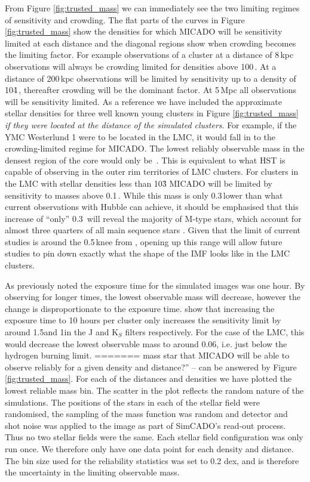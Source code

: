 From Figure \ref{fig:trusted_mass} we can immediately see the two limiting
regimes of sensitivity and crowding. The flat parts of the curves in Figure
\ref{fig:trusted_mass} show the densities for which MICADO will be
sensitivity  limited at each distance and the diagonal regions show when
crowding becomes the limiting factor. For example observations of a cluster
at a distance of 8\,kpc observations will always be crowding limited for
densities above 100\,\spae. At a distance of 200\,kpc observations will be
limited by sensitivity up to a density of 10\h4\,\spa, thereafter crowding
will  be the dominant factor. At 5\,Mpc all observations will be sensitivity
limited. As a reference we have included the approximate stellar densities
for  three well known young clusters in Figure \ref{fig:trusted_mass}
\textit{if they were located at the distance of the simulated clusters}. For
example, if the YMC Westerlund 1 were to be located in the LMC, it would fall
in to the crowding-limited regime for MICADO. The lowest reliably observable
mass in the densest region of the core would only be \,\msun. This is
equivalent to what HST is capable of observing in the outer rim territories
of  LMC clusters. For clusters in the LMC with stellar densities less than
10\h3 MICADO will be limited by sensitivity to masses above 0.1\,\msun. While
this mass is only 0.3\,\msun lower than what current observations with Hubble
can achieve, it should be emphasised that this increase of ``only'' 0.3\,
\msun  will reveal the majority of M-type stars, which account for almost
three  quarters of all main sequence stars \citep{ledrew2001}. Given that the
limit of current studies is around the 0.5\,\msun knee from
\citet{kroupa2001},  opening up this range will allow future studies to pin
down exactly what the shape of the IMF looks like in the LMC clusters.

As previously noted the exposure time for the simulated images was one hour.
By  observing for longer times, the lowest observable mass will decrease,
however the change is disproportionate to the exposure time. \citet{leschinski2016} show that increasing the exposure time to 10 hours per cluster only increases the sensitivity limit by around 1.5\m and 1\m in the J and K$_S$ filters respectively. For the case of the LMC, this would decrease the lowest observable mass to around 0.06\msune, i.e. just below the hydrogen burning limit.
=======
mass star that MICADO will be able to observe reliably for a given density and
distance?'' -- can be answered by Figure \ref{fig:trusted_mass}. For each of
the distances and densities we have plotted the lowest reliable mass bin. The
scatter in the plot reflects the random nature of the simulations. The
positions of the stars in each of the stellar field were randomised, the
sampling of the mass function was random and detector and shot noise was
applied to the image as part of SimCADO's read-out process. Thus no two  stellar
fields were the same. Each stellar field configuration was only run once. We
therefore only have one data point for each density and distance. The bin size
used for the reliability statistics was set to 0.2 dex, and is therefore the
uncertainty in the limiting observable mass.

